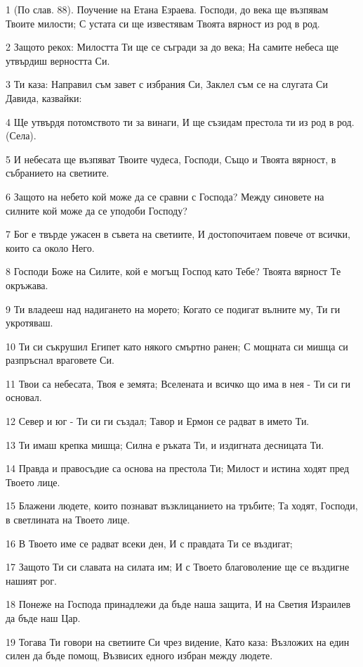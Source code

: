 \par 1 (По слав. 88). Поучение на Етана Езраева. Господи, до века ще възпявам Твоите милости; С устата си ще известявам Твоята вярност из род в род.
\par 2 Защото рекох: Милостта Ти ще се съгради за до века; На самите небеса ще утвърдиш верността Си.
\par 3 Ти каза: Направил съм завет с избрания Си, Заклел съм се на слугата Си Давида, казвайки:
\par 4 Ще утвърдя потомството ти за винаги, И ще съзидам престола ти из род в род. (Села).
\par 5 И небесата ще възпяват Твоите чудеса, Господи, Също и Твоята вярност, в събранието на светиите.
\par 6 Защото на небето кой може да се сравни с Господа? Между синовете на силните кой може да се уподоби Господу?
\par 7 Бог е твърде ужасен в съвета на светиите, И достопочитаем повече от всички, които са около Него.
\par 8 Господи Боже на Силите, кой е могъщ Господ като Тебе? Твоята вярност Те окръжава.
\par 9 Ти владееш над надигането на морето; Когато се подигат вълните му, Ти ги укротяваш.
\par 10 Ти си съкрушил Египет като някого смъртно ранен; С мощната си мишца си разпръснал враговете Си.
\par 11 Твои са небесата, Твоя е земята; Вселената и всичко що има в нея - Ти си ги основал.
\par 12 Север и юг - Ти си ги създал; Тавор и Ермон се радват в името Ти.
\par 13 Ти имаш крепка мишца; Силна е ръката Ти, и издигната десницата Ти.
\par 14 Правда и правосъдие са основа на престола Ти; Милост и истина ходят пред Твоето лице.
\par 15 Блажени людете, които познават възклицанието на тръбите; Та ходят, Господи, в светлината на Твоето лице.
\par 16 В Твоето име се радват всеки ден, И с правдата Ти се въздигат;
\par 17 Защото Ти си славата на силата им; И с Твоето благоволение ще се въздигне нашият рог.
\par 18 Понеже на Господа принадлежи да бъде наша защита, И на Светия Израилев да бъде наш Цар.
\par 19 Тогава Ти говори на светиите Си чрез видение, Като каза: Възложих на един силен да бъде помощ, Възвисих едного избран между людете.
